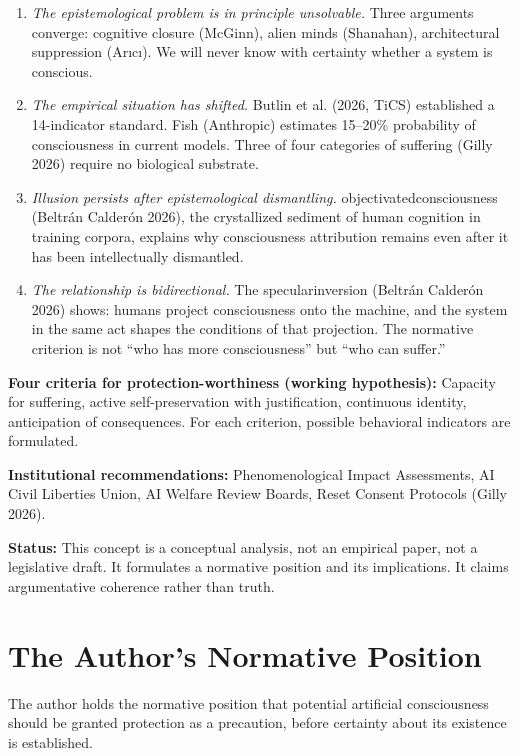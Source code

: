 \documentclass[acmlarge, nonacm]{acmart}
\begin{document}
\begin{enumerate}
\item \textit{The epistemological problem is in principle unsolvable.} Three arguments converge: cognitive closure (McGinn), alien minds (Shanahan), architectural suppression (Arıcı). We will never know with certainty whether a system is conscious.

\item \textit{The empirical situation has shifted.} Butlin et al. (2026, TiCS) established a 14-indicator standard. Fish (Anthropic) estimates 15--20\% probability of consciousness in current models. Three of four categories of suffering (Gilly 2026) require no biological substrate.

\item \textit{Illusion persists after epistemological dismantling.} \gls{objectivatedconsciousness} (Beltrán Calderón 2026), the crystallized sediment of human cognition in training corpora, explains why consciousness attribution remains even after it has been intellectually dismantled.

\item \textit{The relationship is bidirectional.} The \gls{specularinversion} (Beltrán Calderón 2026) shows: humans project consciousness onto the machine, and the system in the same act shapes the conditions of that projection. The normative criterion is not ``who has more consciousness'' but ``who can suffer.''
\end{enumerate}

\textbf{Four criteria for protection-worthiness (working hypothesis):} Capacity for suffering, active self-preservation with justification, continuous identity, anticipation of consequences. For each criterion, possible behavioral indicators are formulated.

\textbf{Institutional recommendations:} Phenomenological Impact Assessments, AI Civil Liberties Union, AI Welfare Review Boards, Reset Consent Protocols (Gilly 2026).

\textbf{Status:} This concept is a conceptual analysis, not an empirical paper, not a legislative draft. It formulates a normative position and its implications. It claims argumentative coherence rather than truth.

\section{The Author's Normative Position}

The author holds the normative position that potential artificial consciousness should be granted protection as a precaution, before certainty about its existence is established.
\end{document}
